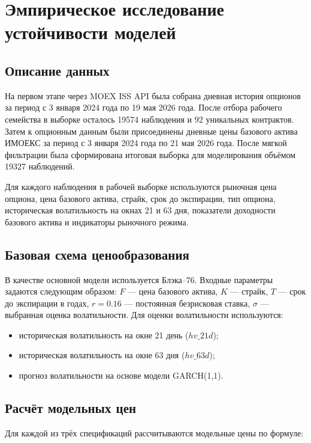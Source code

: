 \documentclass[11pt,a4paper]{article}
\begin{document}
\section{Эмпирическое исследование устойчивости моделей}

\subsection{Описание данных}

На первом этапе через MOEX ISS API была собрана дневная история опционов за период с 3 января 2024 года по 19 мая 2026 года. После отбора рабочего семейства в выборке осталось 19574 наблюдения и 92 уникальных контрактов. Затем к опционным данным были присоединены дневные цены базового актива ИМОЕКС за период с 3 января 2024 года по 21 мая 2026 года. После мягкой фильтрации была сформирована итоговая выборка для моделирования объёмом 19327 наблюдений.

Для каждого наблюдения в рабочей выборке используются рыночная цена опциона, цена базового актива, страйк, срок до экспирации, тип опциона, историческая волатильность на окнах 21 и 63 дня, показатели доходности базового актива и индикаторы рыночного режима.

\subsection{Базовая схема ценообразования}

В качестве основной модели используется Блэка--76. Входные параметры задаются следующим образом: $F$ --- цена базового актива, $K$ --- страйк, $T$ --- срок до экспирации в годах, $r = 0.16$ --- постоянная безрисковая ставка, $\sigma$ --- выбранная оценка волатильности. Для оценки волатильности используются:
\begin{itemize}
    \item историческая волатильность на окне 21 день ($hv\_21d$);
    \item историческая волатильность на окне 63 дня ($hv\_63d$);
    \item прогноз волатильности на основе модели GARCH(1,1).
\end{itemize}

\subsection{Расчёт модельных цен}

Для каждой из трёх спецификаций рассчитываются модельные цены по формуле:
\end{document}
